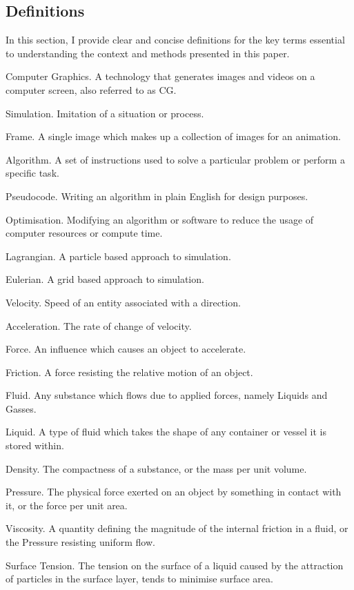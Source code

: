 \documentclass[write-up.tex]{subfiles}
\begin{document}
\subsection{Definitions}
In this section, I provide clear and concise definitions for the key terms essential to understanding the context and methods presented in this paper.
\begin{worddefs}
 \item [Computer Graphics.] A technology that generates images and videos on a computer screen, also referred to as CG.
 \item [Simulation.] Imitation of a situation or process.
 \item [Frame.] A single image which makes up a collection of images for an animation.
 \item [Algorithm.] A set of instructions used to solve a particular problem or perform a specific task.
 \item [Pseudocode.] Writing an algorithm in plain English for design purposes.
 \item [Optimisation.] Modifying an algorithm or software to reduce the usage of computer resources or compute time.
 \item [Lagrangian.] A particle based approach to simulation.
 \item[Eulerian.] A grid based approach to simulation.
 \item[Velocity.] Speed of an entity associated with a direction.
 \item[Acceleration.] The rate of change of velocity.
 \item[Force.] An influence which causes an object to accelerate.
 \item[Friction.] A force resisting the relative motion of an object.
 \item [Fluid.] Any substance which flows due to applied forces, namely Liquids and Gasses.
 \item [Liquid.] A type of fluid which takes the shape of any container or vessel it is stored within.
 \item[Density.] The compactness of a substance, or the mass per unit volume.
 \item[Pressure.] The physical force exerted on an object by something in contact with it, or the force per unit area.
 \item[Viscosity.] A quantity defining the magnitude of the internal friction in a fluid, or the Pressure resisting uniform flow.
 \item[Surface Tension.] The tension on the surface of a liquid caused by the attraction of particles in the surface layer, tends to minimise surface area.
\end{worddefs}
\end{document}
